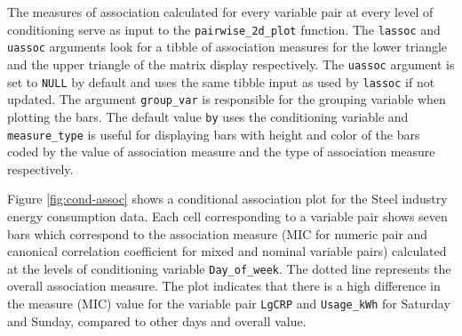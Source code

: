The measures of association calculated for every variable pair at every
level of conditioning serve as input to the \texttt{pairwise\_2d\_plot}
function. The \texttt{lassoc} and \texttt{uassoc} arguments look for a
tibble of association measures for the lower triangle and the upper
triangle of the matrix display respectively. The \texttt{uassoc}
argument is set to \texttt{NULL} by default and uses the same tibble
input as used by \texttt{lassoc} if not updated. The argument
\texttt{group\_var} is responsible for the grouping variable when
plotting the bars. The default value \texttt{by} uses the conditioning
variable and \texttt{measure\_type} is useful for displaying bars with
height and color of the bars coded by the value of association measure
and the type of association measure respectively.

Figure \ref{fig:cond-assoc} shows a conditional association plot for the
Steel industry energy consumption data. Each cell corresponding to a
variable pair shows seven bars which correspond to the association
measure (MIC for numeric pair and canonical correlation coefficient for
mixed and nominal variable pairs) calculated at the levels of
conditioning variable \texttt{Day\_of\_week}. The dotted line represents
the overall association measure. The plot indicates that there is a high
difference in the measure (MIC) value for the variable pair
\texttt{LgCRP} and \texttt{Usage\_kWh} for Saturday and Sunday, compared
to other days and overall value.

